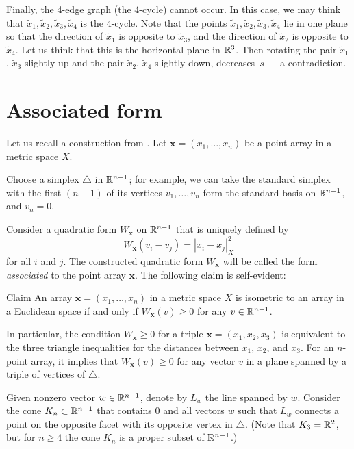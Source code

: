 \documentclass{article}
\begin{document}
Finally, the 4-edge graph (the 4-cycle) cannot occur.
In this case, we may think that $\tilde x_1,\tilde x_2,\tilde x_3,\tilde x_4$ is the 4-cycle.
Note that the points $\tilde x_1,\tilde x_2,\tilde x_3,\tilde x_4$  lie in one plane so that the direction of $\tilde x_1$ is opposite to $\tilde x_3$,
and the direction of $\tilde x_2$ is opposite to $\tilde x_4$.
Let us think that this is the horizontal plane in $\mathbb{R}^3$.
Then rotating the pair $\tilde x_1$, $\tilde x_3$ slightly up and 
the pair $\tilde x_2$, $\tilde x_4$  slightly down, decreases~$s$ --- a contradiction.
\qeds

\section{Associated form}

Let us recall a construction from \cite{petrunin-2017}.
Let $\bm{x}=(x_1,\dots,x_n)$ be a point array in a metric space $X$.

Choose a simplex $\triangle$ in $\mathbb{R}^{n-1}$; for example, we can take the standard simplex with the first $(n-1)$ of its vertices $v_1,\dots,v_n$ form the standard basis on $\mathbb{R}^{n-1}$,
 and $v_n=0$.

Consider a quadratic form $W_{\bm{x}}$ on $\mathbb{R}^{n-1}$ that is uniquely defined by
\[W_{\bm{x}}(v_i-v_j)=|x_i-x_j|^2_X\] 
for all $i$ and $j$.
The constructed quadratic form $W_{\bm{x}}$ will be called
the form \emph{associated} to the point array $\bm{x}$.
The following claim is self-evident:

\begin{thm}{Claim}\label{clm:W>=0}
An array $\bm{x}=(x_1,\dots,x_n)$ in a metric space $X$ is isometric to an array in a Euclidean space if and only if 
$W_{\bm{x}}(v)\ge 0$
for any $v\in \mathbb{R}^{n-1}$.
\end{thm}


In particular, the condition $W_{\bm{x}}\ge 0$ for a triple $\bm{x}=(x_1,x_2,x_3)$ is equivalent to 
the three triangle inequalities for the distances between $x_1$, $x_2$, and $x_3$.
For an $n$-point array, it implies that $W_{\bm{x}}(v)\ge 0$ for any vector $v$ in a plane spanned by a triple of vertices of $\triangle$.

Given nonzero vector $w\in\mathbb{R}^{n-1}$, denote by $L_w$ the line spanned by $w$.
Consider the cone $K_n\subset \mathbb{R}^{n-1}$ that contains $0$ and all vectors $w$ such that $L_w$ connects a point on the opposite facet with its opposite vertex in $\triangle$.
(Note that $K_3=\mathbb{R}^2$, but for $n\ge 4$ the cone $K_n$ is a proper subset of $\mathbb{R}^{n-1}$.)
\end{document}
